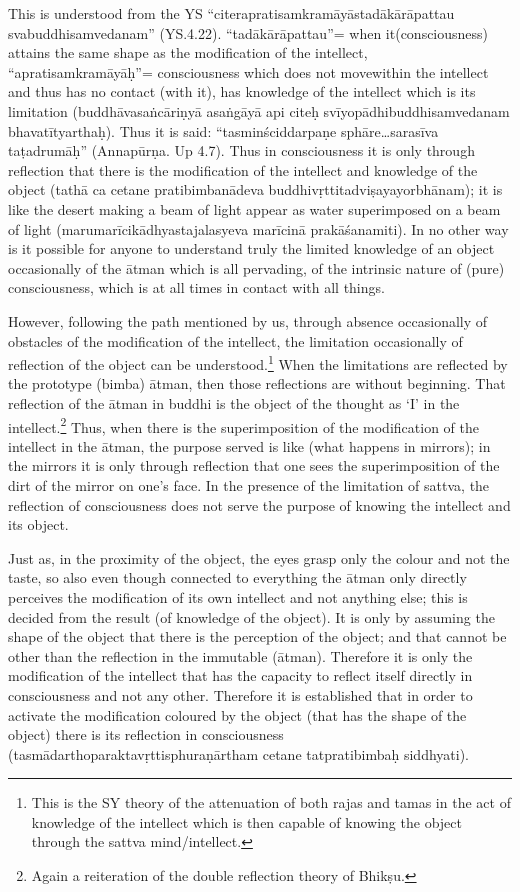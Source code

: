 This is understood from the YS “citerapratisamkramāyāstadākārāpattau svabuddhisamvedanam” (YS.4.22). “tadākārāpattau”= when it\break (consciousness) attains the same shape as the modification of the intellect, “apratisamkramāyāḥ”= consciousness which does not move\break within the intellect and thus has no contact (with it), has knowledge of the intellect which is its limitation (buddhāvasaṅcāriṇyā asaṅgāyā api citeḥ svīyopādhibuddhisamvedanam bhavatītyarthaḥ). Thus it is said: “tasminściddarpaṇe sphāre…sarasīva taṭadrumāḥ” (Annapūrṇa. Up 4.7). Thus in consciousness it is only through reflection that there is the modification of the intellect and knowledge of the object (tathā ca cetane pratibimbanādeva buddhivṛttitadviṣayayorbhānam); it is like the desert making a beam of light appear as water superimposed on a beam of light (marumarīcikādhyastajalasyeva marīcinā prakāśanamiti). In no other way is it possible for anyone to understand truly the limited knowledge of an object occasionally of the ātman which is all pervading, of the intrinsic nature of (pure) consciousness, which is at all times in contact with all things. 

However, following the path mentioned by us, through absence occasionally of obstacles of the modification of the intellect, the limitation occasionally of reflection of the object can be understood.\footnote{This is the SY theory of the attenuation of both rajas and tamas in the act of knowledge of the intellect which is then capable of knowing the object through the sattva mind/intellect.} When the limitations are reflected by the prototype (bimba) ātman, then those reflections are without beginning. That reflection of the ātman in buddhi is the object of the thought as ‘I’ in the intellect.\footnote{Again a reiteration of the double reflection theory of Bhikṣu.}  Thus, when there is the superimposition of the modification of the intellect in the ātman, the purpose served is like (what happens in mirrors);  in the mirrors it is only through reflection that one sees the superimposition of the dirt of the mirror on one’s face. In the presence of the limitation of sattva, the reflection of consciousness does not serve the purpose of knowing the intellect and its object.

Just as, in the proximity of the object, the eyes grasp only the colour and not the taste, so also even though connected to everything the ātman only directly perceives the modification of its own intellect and not anything else; this is decided from the result (of knowledge of the object). It is only by assuming the shape of the object that there is the perception of the object; and that cannot be other than the reflection in the immutable (ātman). Therefore it is only the modification of the intellect that has the capacity to reflect itself directly in consciousness and not any other. Therefore it is established that in order to activate the modification coloured by the object (that has the shape of the object) there is its reflection in consciousness  (tasmādarthoparaktavṛttisphuraṇārtham cetane tatpratibimbaḥ siddhyati).

